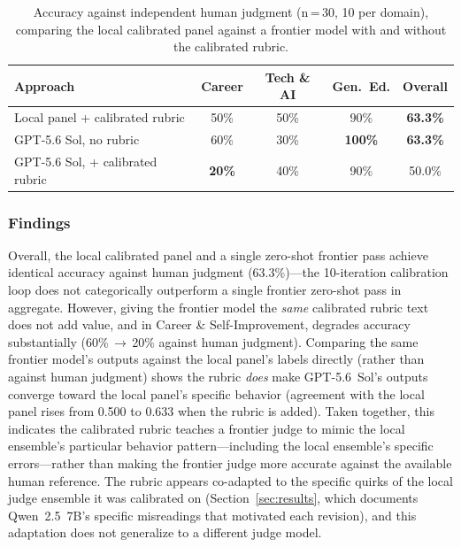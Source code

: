 \documentclass[11pt]{article}
\begin{document}
\begin{table}[ht]
\centering
\caption{Accuracy against independent human judgment (n\,=\,30, 10 per
domain), comparing the local calibrated panel against a frontier model with
and without the calibrated rubric.}
\label{tab:frontier}
\small
\begin{tabular}{lcccc}
\toprule
\textbf{Approach} & \textbf{Career} & \textbf{Tech \& AI} &
\textbf{Gen.\ Ed.} & \textbf{Overall} \\
\midrule
Local panel + calibrated rubric  & 50\%          & 50\%          & 90\%          & \textbf{63.3\%} \\
GPT-5.6 Sol, no rubric            & 60\%          & 30\%          & \textbf{100\%} & \textbf{63.3\%} \\
GPT-5.6 Sol, + calibrated rubric  & \textbf{20\%} & 40\%          & 90\%          & 50.0\%          \\
\bottomrule
\end{tabular}
\end{table}

\subsubsection{Findings}

Overall, the local calibrated panel and a single zero-shot frontier pass
achieve identical accuracy against human judgment (63.3\%)---the 10-iteration
calibration loop does not categorically outperform a single frontier
zero-shot pass in aggregate. However, giving the frontier model the
\emph{same} calibrated rubric text does not add value, and in Career \&
Self-Improvement, degrades accuracy substantially (60\%\,$\to$\,20\%
against human judgment). Comparing the same frontier model's outputs
against the local panel's labels directly (rather than against human
judgment) shows the rubric \emph{does} make GPT-5.6~Sol's outputs converge
toward the local panel's specific behavior (agreement with the local panel
rises from 0.500 to 0.633 when the rubric is added). Taken together, this
indicates the calibrated rubric teaches a frontier judge to mimic the local
ensemble's particular behavior pattern---including the local ensemble's
specific errors---rather than making the frontier judge more accurate
against the available human reference. The rubric appears co-adapted to the specific quirks
of the local judge ensemble it was calibrated on (Section~\ref{sec:results},
which documents Qwen~2.5~7B's specific misreadings that motivated each
revision), and this adaptation does not generalize to a different judge
model.
\end{document}
